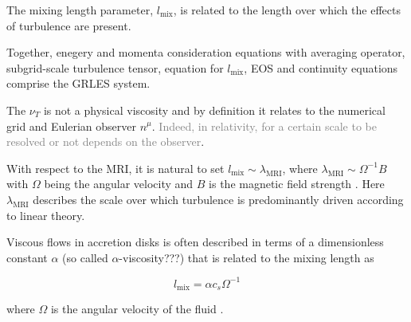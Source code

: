 \documentclass[11pt,a4paper,headinclude=true,DIV=14,BCOR=8mm,chapterprefix,listof=totoc,twoside,openright,abstracton]{scrbook}
\newcommand{\red}[1]{\textcolor{red}{#1}}
\newcommand{\gray}[1]{\textcolor{gray}{#1}}
\begin{document}



The mixing length parameter, $l_{\text{mix}}$, is related to the length over which the effects of turbulence are present. 

Together, enegery and momenta consideration equations with averaging operator, subgrid-scale turbulence tensor, equation for $l_{\text{mix}}$, EOS and continuity equations comprise the GRLES system.


The $\nu_T$ is not a physical viscosity and by definition it relates to the numerical grid and 
Eulerian observer $n^{\mu}$. 
\gray{Indeed, in relativity, for a certain scale to be resolved or not depends on the observer}.



With respect to the MRI, it is natural to set $l_{\text{mix}} \sim \lambda_{\text{MRI}}$, where $\lambda_{\text{MRI}} \sim \Omega^{-1}B$ with $\Omega$ being the angular velocity and $B$ is the magnetic field strength \cite{Duez:2006qe}.
Here $\lambda_{\text{MRI}}$ describes the scale over which turbulence is predominantly driven according to linear theory.


Viscous flows in accretion disks is often described in terms of a dimensionless constant $\alpha$
 (so called $\alpha$-viscosity???) that is related to the mixing length as 

\begin{equation}
    l_{\text{mix}} = \alpha c_s \Omega^{-1}
\end{equation}

where $\Omega$ is the angular velocity of the fluid \cite{Shakura:1972te}.
\end{document}
